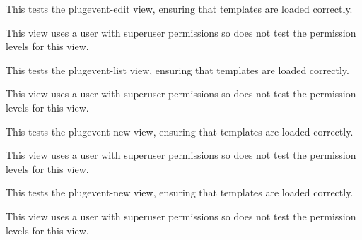 \documentclass[letterpaper,10pt,english]{sphinxmanual}
\begin{document}
\begin{fulllineitems}
\begin{fulllineitems}
\end{fulllineitems}



\begin{fulllineitems}
\label{api:timed_mating.tests.Timed_MatingViewTests.test_plugevent_edit}
This tests the plugevent-edit view, ensuring that templates are loaded correctly.

This view uses a user with superuser permissions so does not test the permission levels for this view.

\end{fulllineitems}



\begin{fulllineitems}
\label{api:timed_mating.tests.Timed_MatingViewTests.test_plugevent_list}
This tests the plugevent-list view, ensuring that templates are loaded correctly.

This view uses a user with superuser permissions so does not test the permission levels for this view.

\end{fulllineitems}



\begin{fulllineitems}
\label{api:timed_mating.tests.Timed_MatingViewTests.test_plugevent_new}
This tests the plugevent-new view, ensuring that templates are loaded correctly.

This view uses a user with superuser permissions so does not test the permission levels for this view.

\end{fulllineitems}



\begin{fulllineitems}
\label{api:timed_mating.tests.Timed_MatingViewTests.test_plugeventbreeding_new}
This tests the plugevent-new view, ensuring that templates are loaded correctly.

This view uses a user with superuser permissions so does not test the permission levels for this view.

\end{fulllineitems}


\end{fulllineitems}
\end{document}
